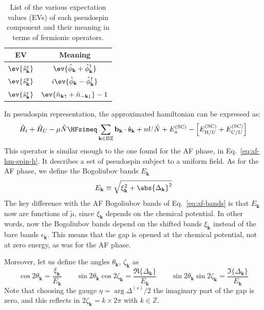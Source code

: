 \begin{table}
	\centering
	\begin{tabular}{c c}
		\textbf{EV} & \textbf{Meaning} \\
		\midrule
		$\ev{\hat s_\mathbf{k}^x}$ & $\ev{
			\hat \phi_\mathbf{k}
			+ \hat \phi_\mathbf{k}^\dagger
		}$ \\[0.7em]
		$\ev{\hat s_\mathbf{k}^y}$ & $i \ev{
			\hat \phi_\mathbf{k}
			- \hat \phi_\mathbf{k}^\dagger
		}$ \\[0.7em]
		$\ev{\hat s_\mathbf{k}^z}$ & $\ev{
			\hat n_{\mathbf{k}\uparrow}
			+ \hat n_{-\mathbf{k}\downarrow}
		} - 1$ \\
		\midrule
	\end{tabular}
	\caption{List of the various expectation values (EVs) of each pseudospin component and their meaning in terms of fermionic operators.}
	\label{tab:sc-pseudo-spin-map}
\end{table}

In pseudospin representation, the approximated hamiltonian can be expressed as:
\begin{equation}\label{eq:sc-hm-spin-h}
	\hat H_t + \hat H_U - \mu \hat N \HFsimeq \sum_{\mathbf{k} \in \mathrm{BZ}} \mathbf{b}_\mathbf{k} \cdot \hat{\mathbf{s}}_\mathbf{k} + nU \hat N + E_\mathrm{a}^{(\mathrm{SC})} - \left[
		E_{\mathrm{H}/U}^{(\mathrm{SC})} + E_{\mathrm{C}/U}^{(\mathrm{SC})}
	\right]
\end{equation}
This operator is similar enough to the one found for the AF phase, in Eq.~\eqref{eq:af-hm-spin-h}. It describes a set of pseudospin subject to a uniform field. As for the AF phase, we define the Bogoliubov bands $E_\mathbf{k}$
\[
	E_\mathbf{k} \equiv \sqrt{\xi_\mathbf{k}^2 + \abs{\Delta_\mathbf{k}}^2}
\]
The key difference with the AF Bogoliubov bands of Eq.~\eqref{eq:af-bands} is that $E_\mathbf{k}$ now are functions of $\tilde{\mu}$, since $\xi_\mathbf{k}$ depends on the chemical potential. In other words, now the Bogoliubov bands depend on the shifted bands $\xi_\mathbf{k}$ instead of the bare bands $\epsilon_\mathbf{k}$. This means that the gap is opened at the chemical potential, not at zero energy, as was for the AF phase.

Moreover, let us define the angles $\theta_\mathbf{k}$, $\zeta_\mathbf{k}$ as
\[
	\cos 2\theta_\mathbf{k} = \frac{\xi_\mathbf{k}}{E_\mathbf{k}}
	\qquad
	\sin 2\theta_\mathbf{k} \cos 2\zeta_\mathbf{k} = \frac{\Re\lbrace \Delta_\mathbf{k} \rbrace}{E_\mathbf{k}}
	\qquad
	\sin 2\theta_\mathbf{k} \sin 2\zeta_\mathbf{k} = \frac{\Im\lbrace \Delta_\mathbf{k} \rbrace}{E_\mathbf{k}}
\]
Note that choosing the gauge $\eta = \arg \Delta^{(s)}/2$ the imaginary part of the gap is zero, and this reflects in $2\zeta_\mathbf{k}=k \times 2\pi$ with $k \in \mathbb{Z}$.

